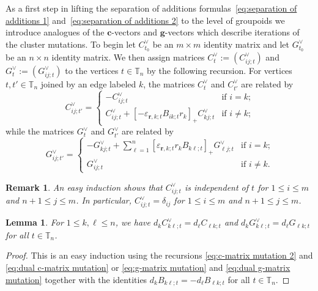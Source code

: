 \documentclass{amsart}
\newtheorem{lemma}[theorem]{Lemma}
\newtheorem{remark}[theorem]{Remark}
\numberwithin{equation}{section}
\newcommand{\bfc}{\mathbf{c}}
\newcommand{\bfg}{\mathbf{g}}
\newcommand{\bfr}{{\boldsymbol{r}}}
\newcommand{\TT}{\mathbb{T}}
\begin{document}
As a first step in lifting the separation of additions formulas~\eqref{eq:separation of additions 1} and~\eqref{eq:separation of additions 2} to the level of groupoids we introduce analogues of the $\bfc$-vectors and $\bfg$-vectors which describe iterations of the cluster mutations.
To begin let $C^\vee_{t_0}$ be an $m\times m$ identity matrix and let $G^\vee_{t_0}$ be an $n\times n$ identity matrix.
We then assign matrices $C^\vee_t:=(C^\vee_{ij;t})$ and $G^\vee_t:=(G^\vee_{ij;t})$ to the vertices $t\in\TT_n$ by the following recursion.
For vertices $t,t'\in\TT_n$ joined by an edge labeled $k$, the matrices $C^\vee_t$ and $C^\vee_{t'}$ are related by
\begin{equation}
  \label{eq:dual c-matrix mutation}
  C^\vee_{ij;t'}=
  \begin{cases}
    -C^\vee_{ij;t} & \text{if $i=k$;}\\
    C^\vee_{ij;t}+[-\varepsilon_{\bfr,k;t} B_{ik;t} r_k]_+ C^\vee_{kj;t} & \text{if $i\ne k$;}
  \end{cases}
\end{equation}
while the matrices $G^\vee_t$ and $G^\vee_{t'}$ are related by
\begin{equation}
  \label{eq:dual g-matrix mutation}
  G^\vee_{ij;t'}=
  \begin{cases}
    -G^\vee_{kj;t}+\sum\limits_{\ell=1}^n [\varepsilon_{\bfr,k;t} r_k B_{k\ell;t}]_+ G^\vee_{\ell j;t} & \text{if $i=k$;}\\
    G^\vee_{ij;t} & \text{if $i\ne k$.}
  \end{cases}
\end{equation}
\begin{remark}
  An easy induction shows that $C^\vee_{ij;t}$ is independent of $t$ for $1\le i\le m$ and $n+1\le j\le m$.
  In particular, $C^\vee_{ij;t}=\delta_{ij}$ for $1\le i\le m$ and $n+1\le j\le m$.
\end{remark}
\begin{lemma}
  \label{le:dual vectors}
  For $1\le k,\ell\le n$, we have $d_kC^\vee_{k\ell;t}=d_\ell C_{\ell k;t}$ and $d_kG^\vee_{k\ell;t}=d_\ell G_{\ell k;t}$ for all $t\in\TT_n$.
\end{lemma}
\begin{proof}
  This is an easy induction using the recursions \eqref{eq:c-matrix mutation 2} and \eqref{eq:dual c-matrix mutation} or \eqref{eq:g-matrix mutation} and \eqref{eq:dual g-matrix mutation} together with the identities $d_k B_{k\ell;t}=-d_\ell B_{\ell k;t}$ for all $t\in\TT_n$.
\end{proof}
\end{document}
